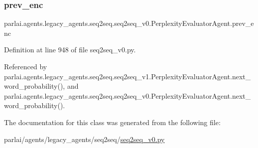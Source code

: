 \subsubsection{\texorpdfstring{prev\+\_\+enc}{prev\_enc}}
{\footnotesize\ttfamily parlai.\+agents.\+legacy\+\_\+agents.\+seq2seq.\+seq2seq\+\_\+v0.\+Perplexity\+Evaluator\+Agent.\+prev\+\_\+enc}



Definition at line 948 of file seq2seq\+\_\+v0.\+py.



Referenced by parlai.\+agents.\+legacy\+\_\+agents.\+seq2seq.\+seq2seq\+\_\+v1.\+Perplexity\+Evaluator\+Agent.\+next\+\_\+word\+\_\+probability(), and parlai.\+agents.\+legacy\+\_\+agents.\+seq2seq.\+seq2seq\+\_\+v0.\+Perplexity\+Evaluator\+Agent.\+next\+\_\+word\+\_\+probability().



The documentation for this class was generated from the following file\+:\begin{DoxyCompactItemize}
\item 
parlai/agents/legacy\+\_\+agents/seq2seq/\hyperlink{seq2seq__v0_8py}{seq2seq\+\_\+v0.\+py}\end{DoxyCompactItemize}
